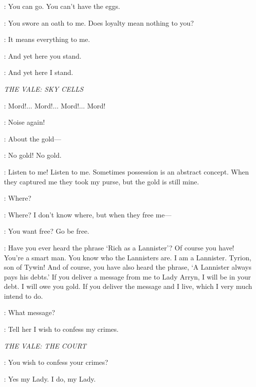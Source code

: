 \JORAH: You can go. You can't have the eggs. 

\VISERYS: You swore an oath to me. Does loyalty mean nothing to you? 

\JORAH: It means everything to me. 

\VISERYS: And yet here you stand. 

\JORAH: And yet here I stand. 



\scene

\textit{THE VALE: SKY CELLS} 


\TYRION: Mord!$\ldots$ Mord!$\ldots$ Mord!$\ldots$ Mord! 


\MORD: Noise again! 

\TYRION: About the gold--- 

\MORD: No gold! No gold. 

\TYRION: Listen to me! Listen to me. Sometimes possession is an abstract concept. When they captured me they took my purse, but the gold is still mine. 

\MORD: Where? 

\TYRION: Where? I don't know where, but when they free me---

\MORD: You want free?  Go be free. 

\TYRION: Have you ever heard the phrase `Rich as a Lannister'? Of course you have! You're a smart man. You know who the Lannisters are. I am a Lannister. Tyrion, son of Tywin! And of course, you have also heard the phrase, `A Lannister always pays his debts.' If you deliver a message from me to Lady Arryn, I will be in your debt. I will owe you gold. If you deliver the message and I live, which I very much intend to do. 

\MORD: What message? 

\TYRION: Tell her I wish to confess my crimes. 


\scene

\textit{THE VALE: THE COURT} 


\LYSA: You wish to confess your crimes? 

\TYRION: Yes my Lady. I do, my Lady. 

